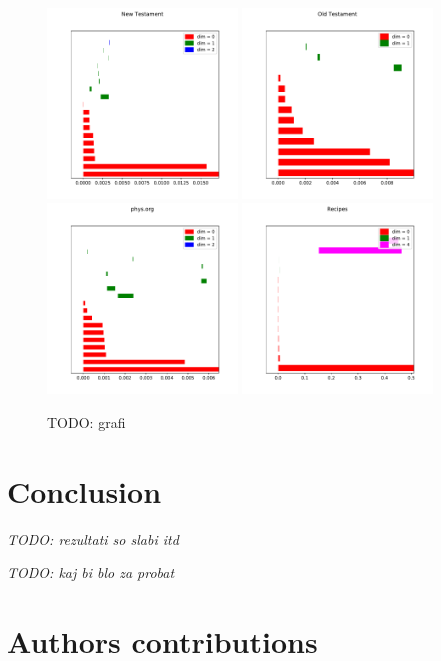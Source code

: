 \documentclass[12pt,a4paper]{amsart}
\begin{document}
\begin{figure}
  \centering
  \includegraphics[width=0.45\textwidth]{../plots/barcodes/bible-new}
  \includegraphics[width=0.45\textwidth]{../plots/barcodes/bible-old}
  \includegraphics[width=0.45\textwidth]{../plots/barcodes/phys}
  \includegraphics[width=0.45\textwidth]{../plots/barcodes/recipes}
  \caption{TODO: grafi}
  \label{fig:barcode:alpha}
\end{figure}

\section{Conclusion}

\emph{TODO: rezultati so slabi itd}

\emph{TODO: kaj bi blo za probat}

\section{Authors contributions}



\end{document}
